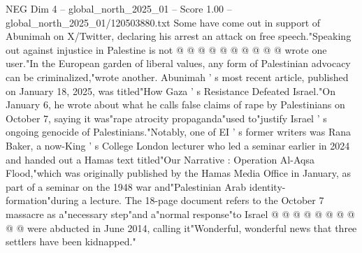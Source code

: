 \begin{textsample}{NEG Dim 4 – global\_north\_2025\_01 – Score 1.00 – global\_north\_2025\_01/120503880.txt}
Some have come out in support of Abunimah on X/Twitter, declaring his arrest an attack on free speech."Speaking out against injustice in Palestine is not @ @ @ @ @ @ @ @ @ @ wrote one user."In the European garden of liberal values, any form of Palestinian advocacy can be criminalized,"wrote another.
Abunimah ' s most recent article, published on January 18, 2025, was titled"How Gaza ' s Resistance Defeated Israel."On January 6, he wrote about what he calls false claims of rape by Palestinians on October 7, saying it was"rape atrocity propaganda"used to"justify Israel ' s ongoing genocide of Palestinians."Notably, one of EI ' s former writers was Rana Baker, a now-King ' s College London lecturer who led a seminar earlier in 2024 and handed out a Hamas text titled"Our Narrative : Operation Al-Aqsa Flood,"which was originally published by the Hamas Media Office in January, as part of a seminar on the 1948 war and"Palestinian Arab identity-formation"during a lecture.
The 18-page document refers to the October 7 massacre as a"necessary step"and a"normal response"to Israel @ @ @ @ @ @ @ @ @ @ were abducted in June 2014, calling it"Wonderful, wonderful news that three settlers have been kidnapped."

\end{textsample}
